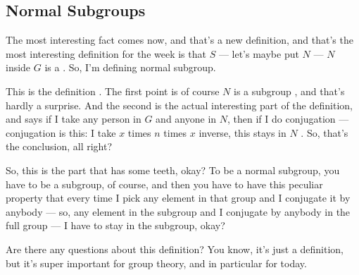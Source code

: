 \subsection{Normal Subgroups}

\begin{speech}[00:45:54 - 00:47:29]
The most interesting fact comes now, and that's a new definition, and that's the most interesting definition for the week is that $S$ --- let's maybe put $N$ --- $N$ inside $G$ is a  . So, I'm defining normal subgroup.

This is the definition . The first point is of course $N$ is a subgroup , and that's hardly a surprise. And the second is the actual interesting part of the definition, and says if I take any person in $G$ and anyone in $N$, then if I do conjugation --- conjugation is this: I take $x$ times $n$ times $x$ inverse, this stays in $N$ . So, that's the conclusion, all right?

So, this is the part that has some teeth, okay? To be a normal subgroup, you have to be a subgroup, of course, and then you have to have this peculiar property that every time I pick any element in that group and I conjugate it by anybody --- so, any element in the subgroup and I conjugate by anybody in the full group --- I have to stay in the subgroup, okay?

Are there any questions about this definition? You know, it's just a definition, but it's super important for group theory, and in particular for today.
\end{speech}

\begin{content}
\end{content}

